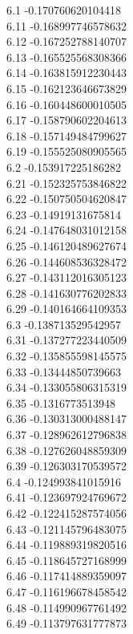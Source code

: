 {6.1	-0.170760620104418\\
6.11	-0.168997746578632\\
6.12	-0.167252788140707\\
6.13	-0.165525568308366\\
6.14	-0.163815912230443\\
6.15	-0.162123646673829\\
6.16	-0.160448600010505\\
6.17	-0.158790602204613\\
6.18	-0.157149484799627\\
6.19	-0.155525080905565\\
6.2	-0.153917225186282\\
6.21	-0.152325753846822\\
6.22	-0.150750504620847\\
6.23	-0.14919131675814\\
6.24	-0.147648031012158\\
6.25	-0.146120489627674\\
6.26	-0.144608536328472\\
6.27	-0.143112016305123\\
6.28	-0.141630776202833\\
6.29	-0.140164664109353\\
6.3	-0.138713529542957\\
6.31	-0.137277223440509\\
6.32	-0.135855598145575\\
6.33	-0.13444850739663\\
6.34	-0.133055806315319\\
6.35	-0.1316773513948\\
6.36	-0.130313000488147\\
6.37	-0.128962612796838\\
6.38	-0.127626048859309\\
6.39	-0.126303170539572\\
6.4	-0.124993841015916\\
6.41	-0.123697924769672\\
6.42	-0.122415287574056\\
6.43	-0.121145796483075\\
6.44	-0.119889319820516\\
6.45	-0.118645727168999\\
6.46	-0.117414889359097\\
6.47	-0.116196678458542\\
6.48	-0.114990967761492\\
6.49	-0.113797631777873\\
}
